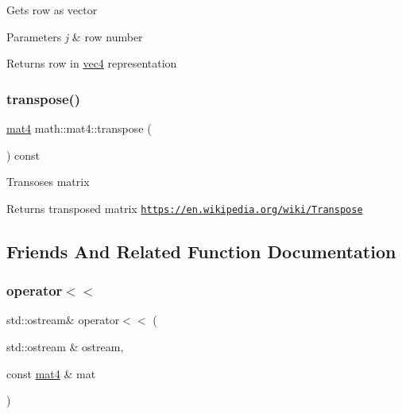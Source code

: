 Gets row as vector 
\begin{DoxyParams}{Parameters}
{\em j} & row number \\
\hline
\end{DoxyParams}
\begin{DoxyReturn}{Returns}
row in \hyperlink{structmath_1_1vec4}{vec4} representation 
\end{DoxyReturn}
\mbox{\label{structmath_1_1mat4_a5377071c3eaa45a552c01985babfa169}} 
\subsubsection{\texorpdfstring{transpose()}{transpose()}}
{\footnotesize\ttfamily \hyperlink{structmath_1_1mat4}{mat4} math\+::mat4\+::transpose (\begin{DoxyParamCaption}{ }\end{DoxyParamCaption}) const\hspace{0.3cm}{\ttfamily [inline]}}

Transoses matrix \begin{DoxyReturn}{Returns}
transposed matrix  \href{https://en.wikipedia.org/wiki/Transpose}{\tt https\+://en.\+wikipedia.\+org/wiki/\+Transpose} 
\end{DoxyReturn}


\subsection{Friends And Related Function Documentation}
\mbox{\label{structmath_1_1mat4_a8cf54e779651b64900748420b9e5137b}} 
\subsubsection{\texorpdfstring{operator$<$$<$}{operator<<}}
{\footnotesize\ttfamily std\+::ostream\& operator$<$$<$ (\begin{DoxyParamCaption}\item[{std\+::ostream \&}]{ostream,  }\item[{const \hyperlink{structmath_1_1mat4}{mat4} \&}]{mat }\end{DoxyParamCaption})\hspace{0.3cm}{\ttfamily [friend]}}


